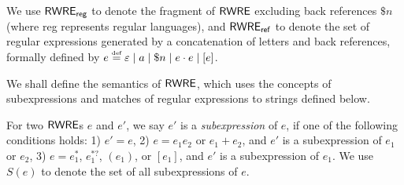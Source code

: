 We use ${\sf RWRE_{reg}}$ to denote the fragment of ${\sf RWRE}$ excluding  back references $\$ n$ (where {\sf reg} represents regular languages), and ${\sf RWRE_{ref}}$ to denote the set of regular expressions generated by a concatenation of letters and back references, formally %
defined by $e \eqdef \varepsilon \mid a \mid \$n \mid e \concat e \mid [e]$.  
  
  

We shall define the semantics of ${\sf RWRE}$, which uses the concepts of subexpressions and matches of regular expressions to strings defined below.
  
   For two ${\sf RWRE}$s $e$ and $e'$, we say $e'$ is a \emph{subexpression} of $e$,
  	if one of the following conditions holds: 1) $e'=e$, 2) $e = e_1 e_2$ or $e_1 + e_2$, and $e'$ is a subexpression of $e_1$ or $e_2$, 3) $e = e_1^{\ast}$, $e_1^{\ast?}$, $(e_1)$, or $[e_1]$, and $e'$ is a subexpression of $e_1$. We use $S (e)$ to denote the set of all subexpressions of $e$. 
  
